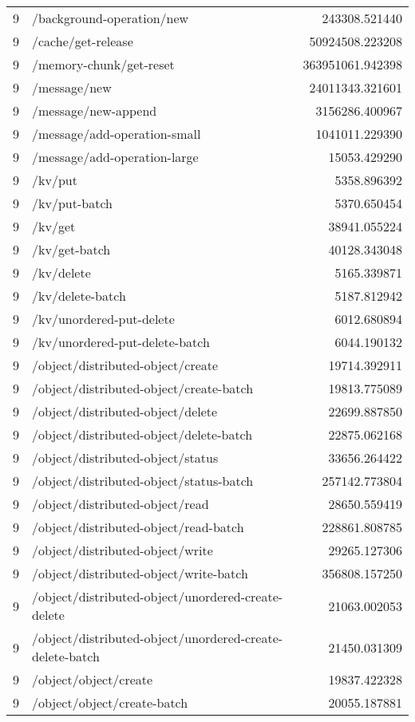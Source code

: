\begin{longtable}{rlr}
9 & /background-operation/new & 243308.521440 \\
9 & /cache/get-release & 50924508.223208 \\
9 & /memory-chunk/get-reset & 363951061.942398 \\
9 & /message/new & 24011343.321601 \\
9 & /message/new-append & 3156286.400967 \\
9 & /message/add-operation-small & 1041011.229390 \\
9 & /message/add-operation-large & 15053.429290 \\
9 & /kv/put & 5358.896392 \\
9 & /kv/put-batch & 5370.650454 \\
9 & /kv/get & 38941.055224 \\
9 & /kv/get-batch & 40128.343048 \\
9 & /kv/delete & 5165.339871 \\
9 & /kv/delete-batch & 5187.812942 \\
9 & /kv/unordered-put-delete & 6012.680894 \\
9 & /kv/unordered-put-delete-batch & 6044.190132 \\
9 & /object/distributed-object/create & 19714.392911 \\
9 & /object/distributed-object/create-batch & 19813.775089 \\
9 & /object/distributed-object/delete & 22699.887850 \\
9 & /object/distributed-object/delete-batch & 22875.062168 \\
9 & /object/distributed-object/status & 33656.264422 \\
9 & /object/distributed-object/status-batch & 257142.773804 \\
9 & /object/distributed-object/read & 28650.559419 \\
9 & /object/distributed-object/read-batch & 228861.808785 \\
9 & /object/distributed-object/write & 29265.127306 \\
9 & /object/distributed-object/write-batch & 356808.157250 \\
9 & /object/distributed-object/unordered-create-delete & 21063.002053 \\
9 & /object/distributed-object/unordered-create-delete-batch & 21450.031309 \\
9 & /object/object/create & 19837.422328 \\
9 & /object/object/create-batch & 20055.187881 \\

\end{longtable}
